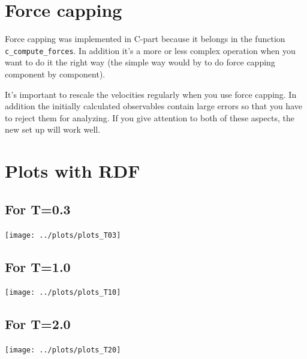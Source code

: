 \documentclass[12pt,a4paper]{scrartcl}
\begin{document}
\section{Force capping}
Force capping was implemented in C-part because it belongs in the function \verb+c_compute_forces+. In addition it's a more or less complex operation when you want to do it the right way (the simple way would by to do force capping component by component).

It's important to rescale the velocities regularly when you use force capping. In addition the initially calculated observables contain large errors so that you have to reject them for analyzing. If you give attention to both of these aspects, the new set up will work well.

\section{Plots with RDF}
\subsection*{For T=0.3}
\texttt{[image: ../plots/plots\_T03]}
\subsection*{For T=1.0}
\texttt{[image: ../plots/plots\_T10]}
\subsection*{For T=2.0}
\texttt{[image: ../plots/plots\_T20]}
\end{document}
